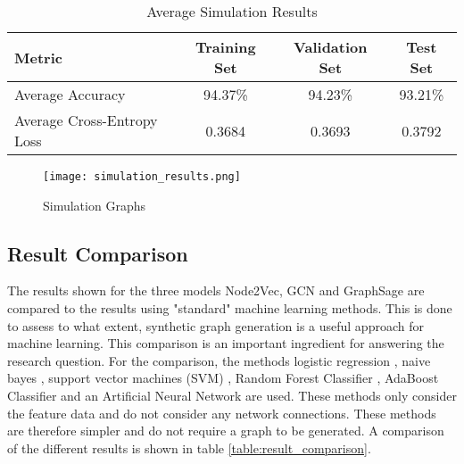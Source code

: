   \begin{table}[h]
    \centering
      \begin{tabular}{|l||c|c|c|}
      \hline
      \textbf{Metric} & \textbf{Training Set} & \textbf{Validation Set} & 
      \textbf{Test Set}\\
      \hline\hline
      Average Accuracy & 94.37\% & 94.23\% & 93.21\% \\\hline 
      Average Cross-Entropy Loss & 0.3684 & 0.3693 & 0.3792 \\
      \hline
      \end{tabular}
    \caption{Average Simulation Results}
    \label{table:simulation_results}
  \end{table}


  \begin{figure}[h]
		\centering
		\texttt{[image: simulation\_results.png]}
		\caption{Simulation Graphs}
        \label{fig:simulation_results}
  \end{figure}

  \subsection{Result Comparison}

  The results shown for the three models Node2Vec, GCN and GraphSage are
  compared to the results using "standard" machine learning methods. This is
  done to assess to what extent, synthetic graph generation is a useful
  approach for machine learning. This comparison is an important ingredient for
  answering the research question. For the comparison, the methods logistic
  regression \citep{cramer2002origins}, naive bayes \citep{zhang2004bayes},
  support vector machines (SVM) \citep{platt1999probabilistic,chang2011libsvm},
  Random Forest Classifier \citep{breiman2001random}, AdaBoost Classifier
  \citep{freund1997decision,hastie2009multi} and an Artificial Neural Network
  \citep{mcculloch1943logical} are used. These methods only consider the
  feature data and do not consider any network connections. These methods are
  therefore simpler and do not require a graph to be generated. A comparison of
  the different results is shown in table \ref{table:result_comparison}.

